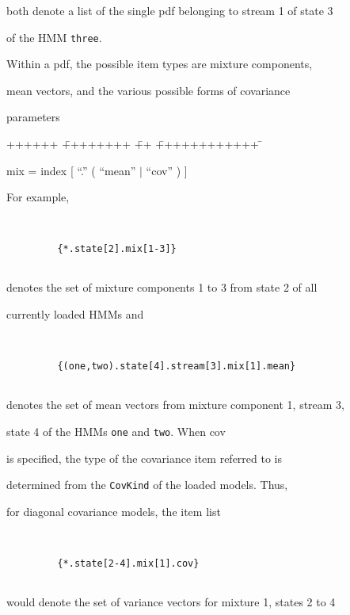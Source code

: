 both denote a list of the single pdf belonging to stream 1 of state 3 


of the HMM \texttt{three}.





Within a pdf, the possible item types are mixture components,


mean vectors, and the various possible forms of covariance


parameters


{\sf


\begin{tabbing}


++++++ \= ++++++++ \= ++ \= ++++++++++++ \=  \kill


\>   mix \>  = \>  index [ ``.'' ( ``mean'' $|$ ``cov'' ) ]


\end{tabbing}}


For example,


\begin{verbatim}


         {*.state[2].mix[1-3]}


\end{verbatim}


denotes the set of mixture components 1 to 3 from state 2 of all


currently loaded HMMs and


\begin{verbatim}


         {(one,two).state[4].stream[3].mix[1].mean}


\end{verbatim}


denotes the set of mean vectors from mixture component 1, stream 3,


state 4 of the HMMs \texttt{one} and \texttt{two}.  When {\sf cov}


is specified, the type of the covariance item referred to is 


determined from the \texttt{CovKind} of the loaded models.  Thus,


for diagonal covariance models, the item list


\begin{verbatim}


         {*.state[2-4].mix[1].cov}


\end{verbatim}


would denote the set of variance vectors for mixture 1, states 2 to 4


